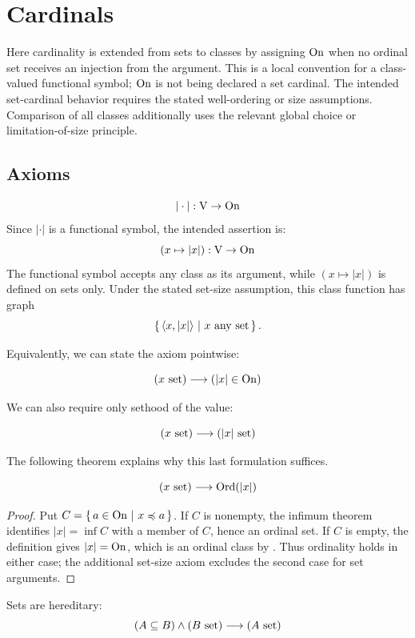 \section{Cardinals}
Here cardinality is extended from sets to classes by assigning $\mathrm{On}$ when
no ordinal set receives an injection from the argument. This is a local
convention for a class-valued functional symbol; $\mathrm{On}$ is not being declared
a set cardinal. The intended set-cardinal behavior requires the stated
well-ordering or size assumptions. Comparison of all classes additionally
uses the relevant global choice or limitation-of-size principle.

\subsection{Axioms}
\begin{iaxiom}
\[
|\cdot|:\mathrm{V} \to \mathrm{On}
\]
Since $|\cdot|$ is a functional symbol, the intended assertion is:
\[
(x\mapsto |x|):\mathrm{V} \to \mathrm{On}
\]
The functional symbol accepts any class as its argument, while
$(x\mapsto |x|)$ is defined on sets only. Under the stated set-size
assumption, this class function has graph
\[
\left\{\,\langle x, |x|\rangle \ \middle|\  x \mathrm{\ any}\mathrm{\ set}\,\right\}.
\]
\end{iaxiom}
Equivalently, we can state the axiom pointwise:
\begin{axiom*}
\[
(x\mathrm{\ set})\longrightarrow(|x|\in\mathrm{On})
\]
\end{axiom*}
We can also require only sethood of the value:
\begin{axiom*}
\[
(x\mathrm{\ set})\longrightarrow(|x|\mathrm{\ set})
\]
\end{axiom*}
The following theorem explains why this last formulation suffices.
\begin{theorem*}
\[
(x\mathrm{\ set})\longrightarrow \mathrm{Ord}(|x|)
\]
\end{theorem*}
\begin{proof}
Put $C=\left\{\,a\in\mathrm{On}\ \middle|\ x\preccurlyeq a\,\right\}$. If $C$ is nonempty, the
infimum theorem identifies $|x|=\inf C$ with a member of $C$, hence an
ordinal set. If $C$ is empty, the definition gives $|x|=\mathrm{On}$, which is
an ordinal class by . Thus ordinality holds in either
case; the additional set-size axiom excludes the second case for set
arguments.
\end{proof}
\begin{iaxiom}[heredity]
Sets are hereditary:
\[
(A\subseteq B)\land (B\mathrm{\ set}) \longrightarrow (A\mathrm{\ set})
\]
\end{iaxiom}

